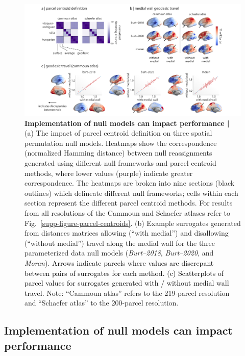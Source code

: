 \documentclass[12pt,aps,pra,reprint,showkeys]{revtex4-1}
\newcommand{\nimg}[1]{\textcolor{black}{{#1}}}
\begin{document}
\begin{figure}[htp]
  \begin{center}
    \centerline{\includegraphics[width=\textwidth]{implementation_differences.png}}
    \caption{
      \textbf{Implementation of null models can impact performance |}
      (a) The impact of parcel centroid definition on three spatial permutation null models.
      Heatmaps show the correspondence (normalized Hamming distance) between null reassignments generated using different null frameworks and parcel centroid methods, where lower values (purple) indicate greater correspondence.
      The heatmaps are broken into nine sections (black outlines) which delineate different null frameworks; cells within each section represent the different parcel centroid methods.
      For results from all resolutions of the Cammoun and Schaefer atlases refer to Fig.~\ref{supp-figure-parcel-centroids}.
      (b) Example surrogates generated from distances matrices allowing (``with medial'') and disallowing (``without medial'') travel along the medial wall for the three parameterized data null models (\textit{Burt–2018}, \textit{Burt–2020}, and \textit{Moran}).
      \nimg{Arrows indicate parcels where values are discrepant between pairs of surrogates for each method.
      (c) Scatterplots of parcel values for surrogates generated with / without medial wall travel. }
      Note: ``Cammoun atlas'' refers to the 219-parcel resolution and ``Schaefer atlas'' to the 200-parcel resolution.
    }
    \label{figure-implementation-differences}
  \end{center}
\end{figure}

\subsection*{Implementation of null models can impact performance}
\end{document}
